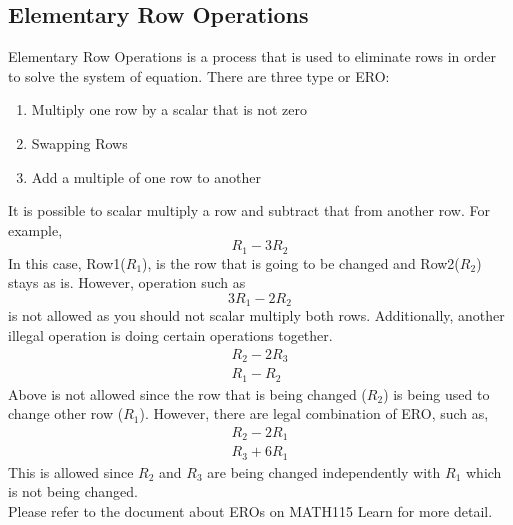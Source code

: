 \documentclass[12pt]{article}
\begin{document}
\subsection{Elementary Row Operations}
Elementary Row Operations is a process that is used to eliminate rows in order to solve the system of equation. There are three type or ERO:
\begin{enumerate}
\item Multiply one row by a scalar that is not zero
\item Swapping Rows
\item Add a multiple of one row to another
\end{enumerate}
It is possible to scalar multiply a row and subtract that from another row. For example, 
\begin{equation}
R_1-3R_2
\end{equation}
In this case, Row1($R_1$), is the row that is going to be changed and Row2($R_2$) stays as is. 
However, operation such as 
\begin{equation}
3R_1 - 2R_2
\end{equation}
is not allowed as you should not scalar multiply both rows. 
Additionally, another illegal operation is doing certain operations together.
\begin{equation}
\begin{split}
R_2-2R_3\\
R_1-R_2
\end{split}
\end{equation}
Above is not allowed since the row that is being changed ($R_2$) is being used to change other row ($R_1$).
However, there are legal combination of ERO, such as,
\begin{equation}
\begin{split}
R_2-2R_1\\
R_3+6R_1
\end{split}
\end{equation}
This is allowed since $R_2$ and $R_3$ are being changed independently with $R_1$ which is not being changed.\\
Please refer to the document about EROs on MATH115 Learn for more detail.
\end{document}
